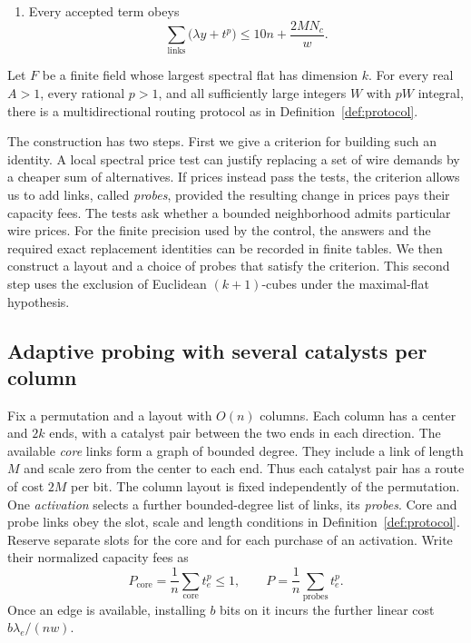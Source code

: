 \begin{definition}
\begin{enumerate}
the layers. At positive scale, \(\lambda=1\).
Each local tensor has a fixed trivalent implementation of size
\(O(w\,\operatorname{polylog}h)\), on a fixed topology configured only by setting
\(O(h\,\operatorname{polylog}h)\) inputs from the control.
The port positions include padding. Unused bits can be pinned to zero.
\item Every accepted term obeys
\begin{equation}\label{eq:protocol-budget}
  \sum_{\text{links}}\bigl(\lambda y+t^p\bigr)
          \le 10n+\frac{2M N_c}{w}.
\end{equation}
\end{enumerate}
\end{definition}

\begin{theorem}\label{thm:protocol}
Let $F$ be a finite field whose largest spectral flat has dimension $k$.
For every real $A>1$, every rational $p>1$, and all sufficiently large
integers $W$ with $pW$ integral, there is a multidirectional routing
protocol as in Definition~\ref{def:protocol}.
\end{theorem}

The construction has two steps. First we give a criterion for building
such an identity. A local spectral price test can justify replacing a
set of wire demands by a cheaper sum of alternatives. If prices instead
pass the tests, the criterion allows us to add links, called
\emph{probes}, provided the resulting change in prices pays their
capacity fees. The tests ask whether a bounded neighborhood admits
particular wire prices. For the finite precision used by the control,
the answers and the required exact replacement identities can be
recorded in finite tables. We then construct a layout and a choice of probes that
satisfy the criterion. This second step uses the exclusion of Euclidean
$(k+1)$-cubes under the maximal-flat hypothesis.

\subsection{Adaptive probing with several catalysts per column}

Fix a permutation and a layout with $O(n)$ columns. Each column has a center and $2k$ ends, with a
catalyst pair between the two ends in each direction. The available
\emph{core} links form a graph of bounded degree. They include a link of
length $M$ and scale zero from the center to each end. Thus each catalyst
pair has a route of cost $2M$ per bit. The column layout is fixed independently of the permutation. One \emph{activation} selects a
further bounded-degree list of links, its \emph{probes}. Core and probe
links obey the slot, scale and length conditions in
Definition~\ref{def:protocol}. Reserve separate slots for the core and
for each purchase of an activation. Write their normalized capacity fees as
\[
 P_{\mathrm{core}}=\frac{1}{n}\sum_{\mathrm{core}}t_e^p
 \le1,\qquad P=\frac{1}{n}\sum_{\mathrm{probes}}t_e^p.
\]
Once an edge is available, installing $b$ bits on it incurs the further
linear cost $b\lambda_e/(nw)$.

